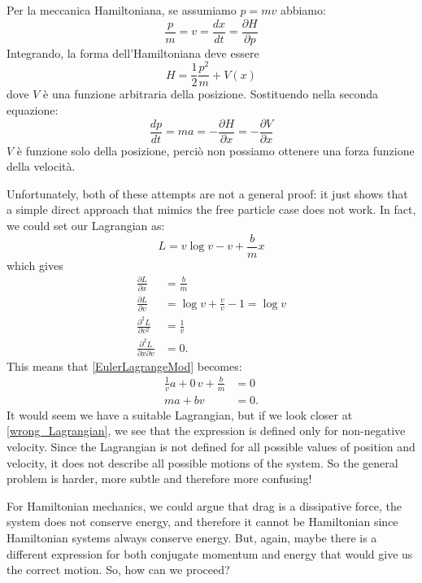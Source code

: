\documentclass[11pt]{article}
\begin{document}
Per la meccanica Hamiltoniana, se assumiamo $p=mv$ abbiamo:
\begin{equation*}
	\frac{p}{m}=v= \frac{dx}{dt} = \frac{\partial H}{\partial p}
\end{equation*}
Integrando, la forma dell'Hamiltoniana deve essere
\begin{equation*}
	H=\frac{1}{2}\frac{p^2}{m} + V(x)
\end{equation*}
dove $V$ \`e una funzione arbitraria della posizione. Sostituendo nella seconda equazione:
\begin{equation*}
	\frac{dp}{dt}= ma = - \frac{\partial H}{\partial x} = - \frac{\partial V}{\partial x}
\end{equation*}
$V$ \`e funzione solo della posizione, perci\`o non possiamo ottenere una forza funzione della velocit\`a.

Unfortunately, both of these attempts are not a general proof: it just shows that a simple direct approach that mimics the free particle case does not work. In fact, we could set our Lagrangian as:
\begin{equation}\label{wrong_Lagrangian}
	L=v \log v - v + \frac{b}{m} x
\end{equation}
which gives
\begin{align*}
	\frac{\partial L}{\partial x} &= \frac{b}{m}\\
	\frac{\partial L}{\partial v} &= \log v + \frac{v}{v} - 1=\log v\\
	\frac{\partial^2 L}{\partial v^2} &= \frac{1}{v}\\
	\frac{\partial^2 L}{\partial x \partial v} &= 0.
\end{align*}
This means that \eqref{EulerLagrangeMod} becomes:
\begin{align*}
	\frac{1}{v} a + 0 \, v + \frac{b}{m} &= 0 \\
	ma + bv &= 0.
\end{align*}
It would seem we have a suitable Lagrangian, but if we look closer at \eqref{wrong_Lagrangian}, we see that the expression is defined only for non-negative velocity. Since the Lagrangian is not defined for all possible values of position and velocity, it does not describe all possible motions of the system. So the general problem is harder, more subtle and therefore more confusing!

For Hamiltonian mechanics, we could argue that drag is a dissipative force, the system does not conserve energy, and therefore it cannot be Hamiltonian since Hamiltonian systems always conserve energy. But, again, maybe there is a different expression for both conjugate momentum and energy that would give us the correct motion. So, how can we proceed?
\end{document}
